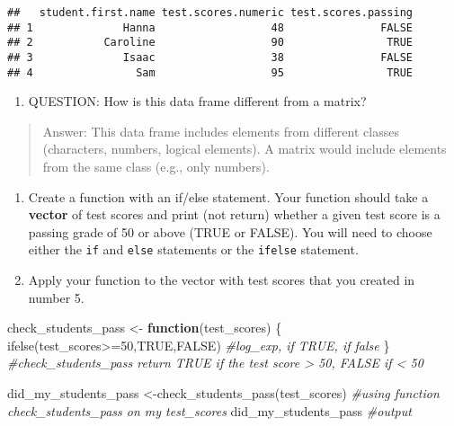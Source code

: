 \documentclass[
]{article}
\newenvironment{Shaded}{\begin{snugshade}}{\end{snugshade}}
\newcommand{\CommentTok}[1]{\textcolor[rgb]{0.56,0.35,0.01}{\textit{#1}}}
\newcommand{\ConstantTok}[1]{\textcolor[rgb]{0.00,0.00,0.00}{#1}}
\newcommand{\ControlFlowTok}[1]{\textcolor[rgb]{0.13,0.29,0.53}{\textbf{#1}}}
\newcommand{\DecValTok}[1]{\textcolor[rgb]{0.00,0.00,0.81}{#1}}
\newcommand{\FunctionTok}[1]{\textcolor[rgb]{0.00,0.00,0.00}{#1}}
\newcommand{\NormalTok}[1]{#1}
\newcommand{\OtherTok}[1]{\textcolor[rgb]{0.56,0.35,0.01}{#1}}
\newcommand{\SpecialCharTok}[1]{\textcolor[rgb]{0.00,0.00,0.00}{#1}}
\providecommand{\tightlist}{%
  \setlength{\itemsep}{0pt}\setlength{\parskip}{0pt}}
\begin{document}
\begin{verbatim}
##   student.first.name test.scores.numeric test.scores.passing
## 1              Hanna                  48               FALSE
## 2           Caroline                  90                TRUE
## 3              Isaac                  38               FALSE
## 4                Sam                  95                TRUE
\end{verbatim}

\begin{enumerate}
\def\labelenumi{\arabic{enumi}.}
\setcounter{enumi}{8}
\tightlist
\item
  QUESTION: How is this data frame different from a matrix?
\end{enumerate}

\begin{quote}
Answer: This data frame includes elements from different classes
(characters, numbers, logical elements). A matrix would include elements
from the same class (e.g., only numbers).
\end{quote}

\begin{enumerate}
\def\labelenumi{\arabic{enumi}.}
\setcounter{enumi}{9}
\item
  Create a function with an if/else statement. Your function should take
  a \textbf{vector} of test scores and print (not return) whether a
  given test score is a passing grade of 50 or above (TRUE or FALSE).
  You will need to choose either the \texttt{if} and \texttt{else}
  statements or the \texttt{ifelse} statement.
\item
  Apply your function to the vector with test scores that you created in
  number 5.
\end{enumerate}

\begin{Shaded}
\begin{Highlighting}[]
\NormalTok{check\_students\_pass }\OtherTok{\textless{}{-}} \ControlFlowTok{function}\NormalTok{(test\_scores) \{}
  \FunctionTok{ifelse}\NormalTok{(test\_scores}\SpecialCharTok{\textgreater{}=}\DecValTok{50}\NormalTok{,}\ConstantTok{TRUE}\NormalTok{,}\ConstantTok{FALSE}\NormalTok{) }\CommentTok{\#log\_exp, if TRUE, if false}
\NormalTok{\}}
\CommentTok{\#check\_students\_pass return TRUE if the test score \textgreater{} 50, FALSE if \textless{} 50}

\NormalTok{did\_my\_students\_pass }\OtherTok{\textless{}{-}}\FunctionTok{check\_students\_pass}\NormalTok{(test\_scores) }
\CommentTok{\#using function check\_students\_pass on my test\_scores}
\NormalTok{did\_my\_students\_pass }\CommentTok{\#output}
\end{Highlighting}
\end{Shaded}
\end{document}
